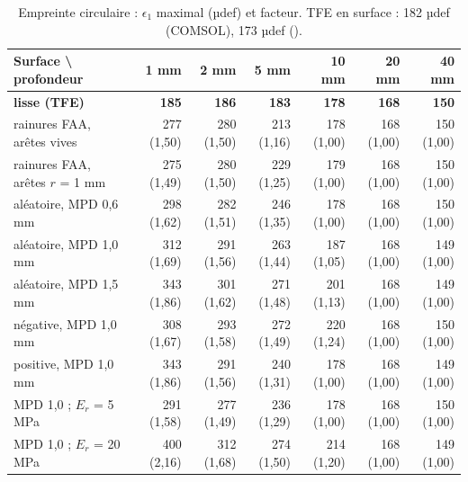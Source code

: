 \begin{table}[H]\centering\footnotesize
\caption{Empreinte circulaire : $\epsilon_1$ maximal (µdef) et facteur. TFE en surface : 182 µdef (COMSOL), 173 µdef (\cs).}\label{tab:circ_e1}
\begin{tabular}{lrrrrrr}
\toprule
Surface \textbackslash{} profondeur & 1 mm & 2 mm & 5 mm & 10 mm & 20 mm & 40 mm\\
\midrule
\textbf{lisse (TFE)} & \textbf{185} & \textbf{186} & \textbf{183} & \textbf{178} & \textbf{168} & \textbf{150}\\ \midrule
rainures FAA, arêtes vives & 277 (1,50) & 280 (1,50) & 213 (1,16) & 178 (1,00) & 168 (1,00) & 150 (1,00)\\
rainures FAA, arêtes $r$ = 1 mm & 275 (1,49) & 280 (1,50) & 229 (1,25) & 179 (1,00) & 168 (1,00) & 150 (1,00)\\
aléatoire, MPD 0,6 mm & 298 (1,62) & 282 (1,51) & 246 (1,35) & 178 (1,00) & 168 (1,00) & 150 (1,00)\\
aléatoire, MPD 1,0 mm & 312 (1,69) & 291 (1,56) & 263 (1,44) & 187 (1,05) & 168 (1,00) & 149 (1,00)\\
aléatoire, MPD 1,5 mm & 343 (1,86) & 301 (1,62) & 271 (1,48) & 201 (1,13) & 168 (1,00) & 149 (1,00)\\
négative, MPD 1,0 mm & 308 (1,67) & 293 (1,58) & 272 (1,49) & 220 (1,24) & 168 (1,00) & 150 (1,00)\\
positive, MPD 1,0 mm & 343 (1,86) & 291 (1,56) & 240 (1,31) & 178 (1,00) & 168 (1,00) & 149 (1,00)\\
MPD 1,0 ; $E_r$ = 5 MPa & 291 (1,58) & 277 (1,49) & 236 (1,29) & 178 (1,00) & 168 (1,00) & 150 (1,00)\\
MPD 1,0 ; $E_r$ = 20 MPa & 400 (2,16) & 312 (1,68) & 274 (1,50) & 214 (1,20) & 168 (1,00) & 149 (1,00)\\
\bottomrule
\end{tabular}
\end{table}

